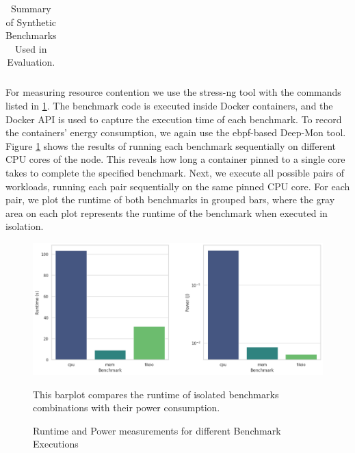 \begin{table}[H]
{\begin{tabular}{
                p{3cm}   %
                p{6cm}   %
                p{3cm}   %
                p{4cm}   %
            }
            \bottomrule
        \end{tabular}%
    }
    \small
    \caption{Summary of Synthetic Benchmarks Used in Evaluation.}
    \label{tab:synthetic-benchmarks}
\end{table}


For measuring resource contention we use the stress-ng tool with the commands listed in \ref{tab:synthetic-benchmarks}. The benchmark code is executed inside Docker containers, and the Docker API is used to capture the execution time of each benchmark. To record the containers' energy consumption, we again use the ebpf-based Deep-Mon tool.
Figure \ref{fig:bar_plot_iso_bench} shows the results of running each benchmark sequentially on different CPU cores of the node. This reveals how long a container pinned to a single core takes to complete the specified benchmark. Next, we execute all possible pairs of workloads, running each pair sequentially on the same pinned CPU core. For each pair, we plot the runtime of both benchmarks in grouped bars, where the gray area on each plot represents the runtime of the benchmark when executed in isolation.

\begin{figure}[H]
    \centering
    \includegraphics[scale=0.5]{fig/06/06-barplot-iso-bench.png}
    \small
    \caption{Runtime and Power measurements for different Benchmark Executions}
    \label{fig:bar_plot_iso_bench}
    \tiny
    This barplot compares the runtime of isolated benchmarks combinations with their power consumption.
\end{figure}

